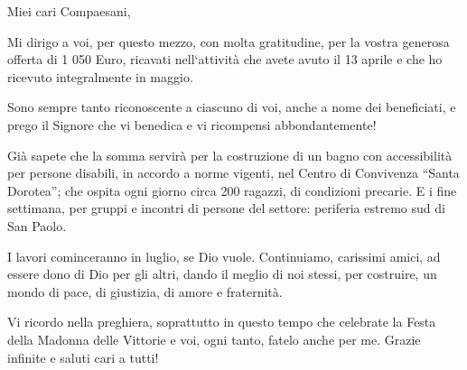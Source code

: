 \begin{citazione}
Miei cari Compaesani,

Mi dirigo a voi, per questo mezzo,  con molta gratitudine, per la vostra generosa offerta di 1 050 Euro, ricavati nell`attività che avete avuto il 13 aprile e che ho ricevuto integralmente in maggio.


Sono sempre tanto riconoscente a ciascuno di voi, anche a nome dei beneficiati, e prego il Signore che vi benedica e vi ricompensi abbondantemente!

Già sapete che la somma servirà per la costruzione di un bagno con accessibilità per persone disabili, in accordo a norme vigenti, nel Centro di Convivenza ``Santa Dorotea''; che ospita ogni giorno circa 200 ragazzi, di condizioni precarie. E i fine settimana, per gruppi e incontri di persone del settore: periferia estremo sud di San Paolo.

I lavori cominceranno in luglio, se Dio vuole. Continuiamo, carissimi amici, ad essere dono di Dio per gli altri, dando il meglio di noi stessi, per costruire, un mondo di pace, di giustizia, di amore e fraternità.

Vi ricordo nella preghiera, soprattutto in questo tempo che celebrate la Festa della Madonna delle Vittorie e voi, ogni tanto, fatelo anche per me.
Grazie infinite e saluti cari a tutti!
\end{citazione}


